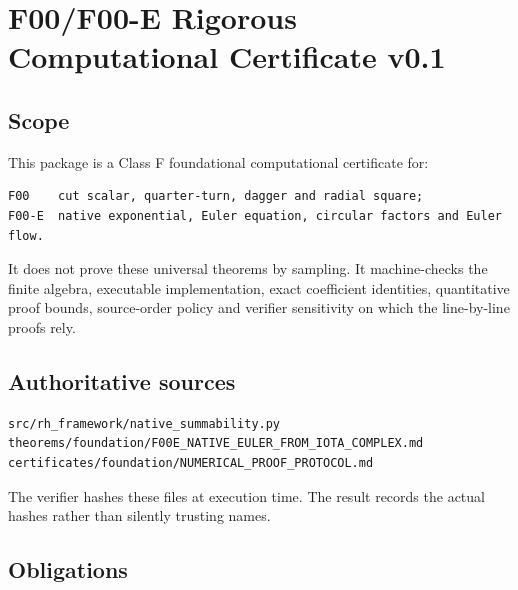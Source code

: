 \hypertarget{f00f00-e-rigorous-computational-certificate-v0.1}{%
\chapter{F00/F00-E Rigorous Computational Certificate v0.1}\label{f00f00-e-rigorous-computational-certificate-v0.1}}

\hypertarget{scope}{%
\section{Scope}\label{scope}}

This package is a Class F foundational computational certificate for:

\begin{verbatim}
F00    cut scalar, quarter-turn, dagger and radial square;
F00-E  native exponential, Euler equation, circular factors and Euler flow.
\end{verbatim}

It does not prove these universal theorems by sampling. It machine-checks the
finite algebra, executable implementation, exact coefficient identities,
quantitative proof bounds, source-order policy and verifier sensitivity on which
the line-by-line proofs rely.

\hypertarget{authoritative-sources}{%
\section{Authoritative sources}\label{authoritative-sources}}

\begin{verbatim}
src/rh_framework/native_summability.py
theorems/foundation/F00E_NATIVE_EULER_FROM_IOTA_COMPLEX.md
certificates/foundation/NUMERICAL_PROOF_PROTOCOL.md
\end{verbatim}

The verifier hashes these files at execution time. The result records the actual
hashes rather than silently trusting names.

\hypertarget{obligations}{%
\section{Obligations}\label{obligations}}


